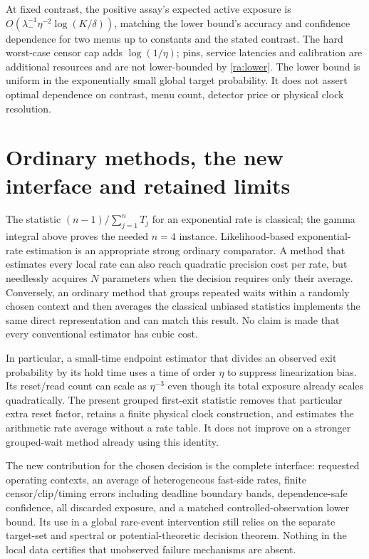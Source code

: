 At fixed contrast, the positive assay's expected active exposure is
$O(\lambda_-^{-1}\eta^{-2}\log(K/\delta))$, matching the lower bound's
accuracy and confidence dependence for two menus up to constants and
the stated contrast. The hard worst-case censor cap adds
$\log(1/\eta)$; pins, service latencies and calibration are additional
resources and are not lower-bounded by \eqref{ra:lower}.
The lower bound is uniform in the exponentially small global target
probability. It does not assert optimal dependence on contrast, menu
count, detector price or physical clock resolution.

\section{Ordinary methods, the new interface and retained limits}
The statistic $(n-1)/\sum_{j=1}^nT_j$ for an exponential rate is
classical; the gamma integral above proves the needed $n=4$ instance.
Likelihood-based exponential-rate estimation is an appropriate strong
ordinary comparator. A method that estimates every local rate can also
reach quadratic precision cost per rate, but needlessly acquires $N$
parameters when the decision requires only their average. Conversely,
an ordinary method that groups repeated waits within a randomly chosen
context and then averages the classical unbiased statistics implements
the same direct representation and can match this result. No claim is
made that every conventional estimator has cubic cost.

In particular, a small-time endpoint estimator that divides an observed
exit probability by its hold time uses a time of order $\eta$ to suppress
linearization bias. Its reset/read count can scale as $\eta^{-3}$ even
though its total exposure already scales quadratically. The present
grouped first-exit statistic removes that particular extra reset factor,
retains a finite physical clock construction, and estimates the
arithmetic rate average without a rate table. It does not improve on a
stronger grouped-wait method already using this identity.

The new contribution for the chosen decision is the complete interface:
requested operating contexts, an average of heterogeneous fast-side
rates, finite censor/clip/timing errors including deadline boundary bands,
dependence-safe confidence, all discarded exposure, and a matched
controlled-observation lower bound. Its use in a global rare-event
intervention still relies on the separate target-set and spectral or
potential-theoretic decision theorem. Nothing in the local data certifies
that unobserved failure mechanisms are absent.
